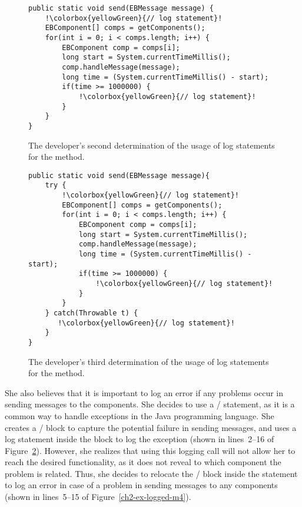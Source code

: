 \begin{figure}[p]
\def\baselinestretch{1}
\begin{lstlisting}[escapechar=!]
public static void send(EBMessage message) {
    !\colorbox{yellowGreen}{// log statement}!
    EBComponent[] comps = getComponents();
    for(int i = 0; i < comps.length; i++) {
        EBComponent comp = comps[i];
        long start = System.currentTimeMillis();
        comp.handleMessage(message);
        long time = (System.currentTimeMillis() - start);
        if(time >= 1000000) {
            !\colorbox{yellowGreen}{// log statement}!
        }
    }
}
\end{lstlisting}
\caption[The developer's second determination of the usage of log statements.]{The developer's second determination of the usage of log statements for the  method.\label{ch2-ex-logged-m2}}
\end{figure}

\begin{figure}[p]
\def\baselinestretch{1}
\begin{lstlisting}[escapechar=!]
public static void send(EBMessage message){
    try {
        !\colorbox{yellowGreen}{// log statement}!
        EBComponent[] comps = getComponents();
        for(int i = 0; i < comps.length; i++) {
            EBComponent comp = comps[i];
            long start = System.currentTimeMillis();
            comp.handleMessage(message);
            long time = (System.currentTimeMillis() - start);
            if(time >= 1000000) {
                !\colorbox{yellowGreen}{// log statement}!
            }
        }
    } catch(Throwable t) {
       !\colorbox{yellowGreen}{// log statement}!
    }
}
\end{lstlisting}
\caption[The developer's third determination of the usage of log statements.]{The developer's third determination of the usage of log statements for the  method.\label{ch2-ex-logged-m3}}
\end{figure}

She also believes that it is important to log an error if any problems occur in sending messages to the components. She decides to use a / statement, as it is a common way to handle exceptions in the Java programming language. She creates a / block to capture the potential failure in sending messages, and uses a log statement inside the  block to log the exception (shown in lines~2--16 of Figure~\ref{ch2-ex-logged-m3}). However, she realizes that using this logging call will not allow her to reach the desired functionality, as it does not reveal to which component the problem is related. Thus, she decides to relocate the / block inside the  statement to log an error in case of a problem in sending messages to any components (shown in lines~5--15 of Figure~\ref{ch2-ex-logged-m4}).


